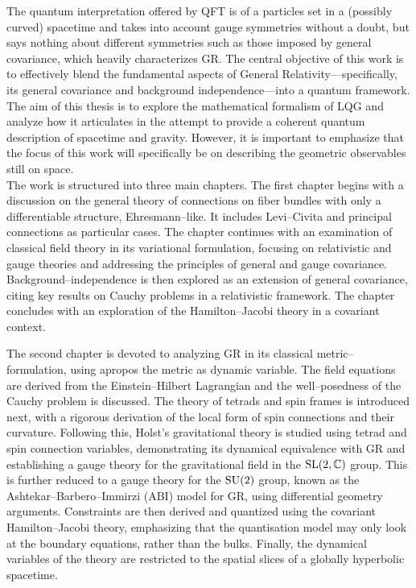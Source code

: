 The quantum interpretation offered by QFT is of a particles set in a (possibly curved) spacetime and takes into account gauge symmetries without a doubt, but says nothing about different symmetries such as those imposed by general covariance, which heavily characterizes GR.  The central objective of this work is to effectively blend the fundamental aspects of General Relativity—specifically, its general covariance and background independence—into a quantum framework. The aim of this thesis is to explore the mathematical formalism of LQG and analyze how it articulates in the attempt to provide a coherent quantum description of spacetime and gravity. However, it is important to emphasize that the focus of this work will specifically be on describing the geometric observables still on space.\\ 

The work is structured into three main chapters. The first chapter begins with a discussion on the general theory of connections on fiber bundles with only a differentiable structure, Ehresmann--like. It includes Levi--Civita and principal connections as particular cases. The chapter continues with an examination of classical field theory in its variational formulation, focusing on relativistic and gauge theories and addressing the principles of general and gauge covariance. Background--independence is then explored as an extension of general covariance, citing key results on Cauchy problems in a relativistic framework. The chapter concludes with an exploration of the Hamilton--Jacobi theory in a covariant context.

The second chapter is devoted to analyzing GR in its classical metric--formulation, using apropos the metric as dynamic variable. The field equations are derived from the Einstein--Hilbert Lagrangian and the well--posedness of the Cauchy problem is discussed. The theory of tetrads and spin frames is introduced next, with a rigorous derivation of the local form of spin connections and their curvature. Following this, Holst's gravitational theory is studied using tetrad and spin connection variables, demonstrating its dynamical equivalence with GR and establishing a gauge theory for the gravitational field in the $\text{\normalfont SL}(2,\mathbb{C})$ group. This is further reduced to a gauge theory for the $\text{\normalfont SU}(2)$ group, known as the Ashtekar--Barbero--Immirzi (ABI) model for GR, using differential geometry arguments. Constraints are then derived and quantized using the covariant Hamilton--Jacobi theory, emphasizing that the quantisation model may only look at the boundary equations, rather than the bulks. Finally, the dynamical variables of the theory are restricted to the spatial slices of a globally hyperbolic spacetime.

